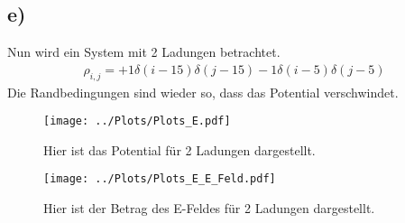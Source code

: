\subsection*{e)}
Nun wird ein System mit 2 Ladungen  betrachtet.
\begin{align}
	\rho_{i,j}=+1\delta(i-15)\delta(j-15)-1\delta(i-5)\delta(j-5)
\end{align}
Die Randbedingungen sind wieder so, dass das Potential verschwindet.
\begin{figure}[h!]
	\centering
	\texttt{[image: ../Plots/Plots\_E.pdf]}
	\caption{Hier ist das Potential für 2 Ladungen dargestellt.}
\end{figure}
\begin{figure}[h!]
	\centering
	\texttt{[image: ../Plots/Plots\_E\_E\_Feld.pdf]}
	\caption{Hier ist der Betrag des E-Feldes für 2 Ladungen dargestellt.}
\end{figure}